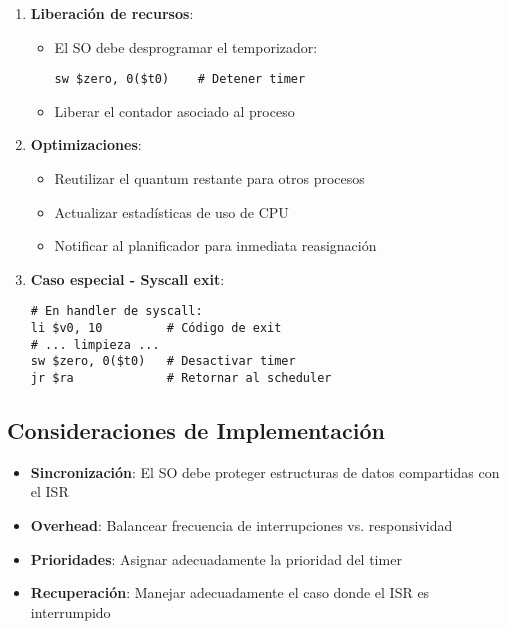 \documentclass{article}
\begin{document}
\begin{enumerate}
\item \textbf{Liberación de recursos}:
\begin{itemize}
\item El SO debe desprogramar el temporizador:
\begin{verbatim}
sw $zero, 0($t0)    # Detener timer
\end{verbatim}
\item Liberar el contador asociado al proceso
\end{itemize}

\item \textbf{Optimizaciones}:
\begin{itemize}
\item Reutilizar el quantum restante para otros procesos
\item Actualizar estadísticas de uso de CPU
\item Notificar al planificador para inmediata reasignación
\end{itemize}

\item \textbf{Caso especial - Syscall exit}:
\begin{verbatim}
# En handler de syscall:
li $v0, 10         # Código de exit
# ... limpieza ...
sw $zero, 0($t0)   # Desactivar timer
jr $ra             # Retornar al scheduler
\end{verbatim}
\end{enumerate}

\subsection{Consideraciones de Implementación}

\begin{itemize}
\item \textbf{Sincronización}: El SO debe proteger estructuras de datos compartidas con el ISR
\item \textbf{Overhead}: Balancear frecuencia de interrupciones vs. responsividad
\item \textbf{Prioridades}: Asignar adecuadamente la prioridad del timer
\item \textbf{Recuperación}: Manejar adecuadamente el caso donde el ISR es interrumpido
\end{itemize}
\end{document}
